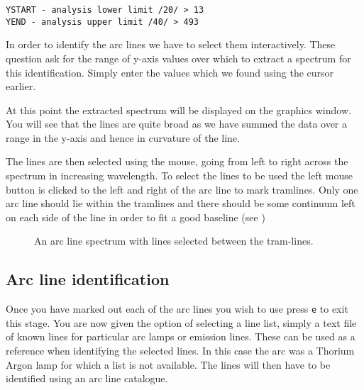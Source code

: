 {\scspec{\small}{}
\begin{verbatim}
YSTART - analysis lower limit /20/ > 13
YEND - analysis upper limit /40/ > 493
\end{verbatim}
}



In order to identify the arc lines we have to select them interactively. These question ask for the range of y-axis values over which to extract a spectrum for this identification. Simply enter the values which we found using the cursor earlier.

At this point the extracted spectrum will be displayed on the graphics window. You will see that the lines are quite broad as we have summed the data over a range in the y-axis and hence in curvature of the line.

The lines are then selected using the mouse, going from left to right across the spectrum in increasing wavelength.
To select the lines to be used the left mouse button is clicked to the left and right of the arc line to mark tramlines. Only one arc line should lie within the tramlines and there should be some continuum left on each side of the line in order to fit a good baseline (see )


\begin{figure}
\begin{center}
{\leavevmode\epsfysize=136mm}

\parbox{140mm}{
\caption{An arc line spectrum with lines selected between the tram-lines.}
\label{arc_select}
}
\end{center}
\end{figure}


\subsection{Arc line identification}

Once you have marked out each of the arc lines you wish to use press {\tt e} to exit this stage. You are now given the option of selecting a line list, simply a text file of known lines for particular arc lamps or emission lines. These can be used as a reference when identifying the selected lines. In this case the arc was a Thorium Argon lamp for which a list is not available. The lines will then have to be identified using an arc line catalogue.


